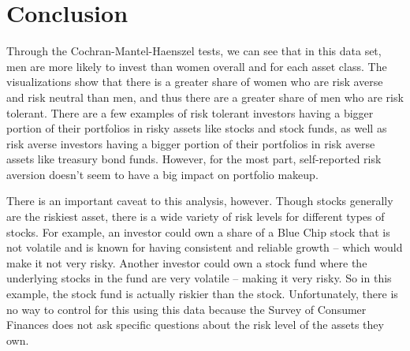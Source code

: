 \documentclass[
]{article}
\begin{document}
\hypertarget{conclusion}{%
\section{Conclusion}\label{conclusion}}

Through the Cochran-Mantel-Haenszel tests, we can see that in this data
set, men are more likely to invest than women overall and for each asset
class. The visualizations show that there is a greater share of women
who are risk averse and risk neutral than men, and thus there are a
greater share of men who are risk tolerant. There are a few examples of
risk tolerant investors having a bigger portion of their portfolios in
risky assets like stocks and stock funds, as well as risk averse
investors having a bigger portion of their portfolios in risk averse
assets like treasury bond funds. However, for the most part,
self-reported risk aversion doesn't seem to have a big impact on
portfolio makeup.

There is an important caveat to this analysis, however. Though stocks
generally are the riskiest asset, there is a wide variety of risk levels
for different types of stocks. For example, an investor could own a
share of a Blue Chip stock that is not volatile and is known for having
consistent and reliable growth -- which would make it not very risky.
Another investor could own a stock fund where the underlying stocks in
the fund are very volatile -- making it very risky. So in this example,
the stock fund is actually riskier than the stock. Unfortunately, there
is no way to control for this using this data because the Survey of
Consumer Finances does not ask specific questions about the risk level
of the assets they own.
\end{document}
